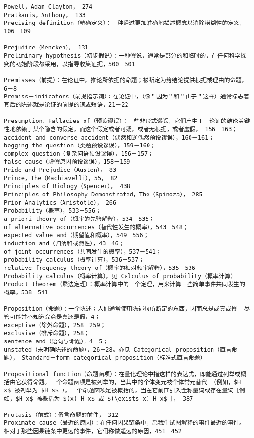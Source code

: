 \begin{verbatim}
Powell，Adam Clayton， 274
Pratkanis，Anthony， 133
Precising definition（精确定义）：一种通过更加准确地描述概念以消除模糊性的定义， 106－109

Prejudice（Mencken）， 131
Preliminary hypothesis（初步假说）：一种假说，通常是部分的和临时的，在任何科学探究的初始阶段都采用，以指导收集证据，500－501

Premisses（前提）：在论证中，推论所依据的命题；被断定为给结论提供根据或理由的命题，6－8
Premiss－indicators（前提指示词）：在论证中，（像＂因为＂和＂由于＂这样）通常标志着其后的陈述就是论证的前提的词或短语，21－22

Presumption，Fallacies of（预设谬误）：一些非形式谬误，它们产生于一论证的结论关键性地依赖于某个隐含的假定，而这个假定或者可疑，或者无根据，或者虚假， 156－163；
accident and converse accident（偶然和逆偶然预设谬误），160－161；
begging the question（奀题预设谬误），159－160；
complex question（复杂问语预设谬误），156－157；
false cause（虚假原因预设谬误），158－159
Pride and Prejudice（Austen）， 83
Prince，The（Machiavelli），55， 82
Principles of Biology（Spencer）， 438
Principles of Philosophy Demonstrated，The（Spinoza）， 285
Prior Analytics（Aristotle）， 266
Probability（概率），533－556；
a priori theory of（概率的先验解释），534－535；
of alternative occurrences（替代性发生的概率），543－548；
expected value and（期望值和概率），549－556；
induction and（归纳和或然性），43－46；
of joint occurrences（共同发生的概率），537－541；
probability calculus（概率计算），536－537；
relative frequency theory of（概率的相对频率解释），535－536
Probability calculus（概率计算），见 Calculus of probability（概率计算）
Product theorem（乘法定理）：概率计算中的一个定理，用来计算一些简单事件共同发生的概率，538－541

Proposition（命题）：一个陈述；人们通常使用陈述句所断定的东西，因而总是或真或假——尽管可能并不知道究竟是真还是假，4；
exceptive（除外命题），258－259；
exclusive（排斥命题），258；
sentence and（语句与命题），4－5；
unstated（未明确陈述的命题），26－28。亦见 Categorical proposition（直言命题）， Standard－form categorical proposition（标准式直言命题）

Propositional function（命题函项）：在量化理论中指这样的表达式，即能通过列举或概括由它获得命题。一个命题函项是被列举的，当其中的个体变元被个体常元替代 （例如，$H x$ 被列举为 $H s$ ）。一个命题函项是被概括的，当在它前面引入全称量词或存在量词［例如，$H x$ 被概括为 $(x) H x$ 或 $(\exists x) H x$ ］， 387

Protasis（前式）：假言命题的前件， 312
Proximate cause（最近的原因）：在任何因果链条中，禹我们试图解释的事件最近的事件。相对于那些因果链条中更远的事件，它们称做遥远的原因，451－452


\end{verbatim}
